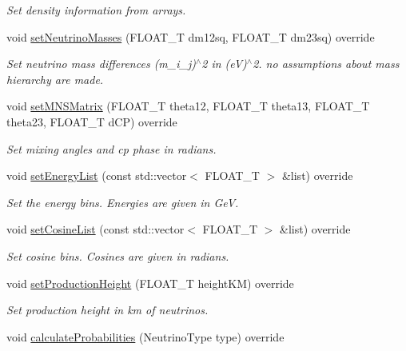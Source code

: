 \begin{DoxyCompactItemize}
\begin{DoxyCompactList}\small\item\em Set density information from arrays. \end{DoxyCompactList}\item 
void \hyperlink{classcudaprob3_1_1CudaPropagator_abb9d8cc79c88f9cf6886cd334ed9e869}{set\+Neutrino\+Masses} (F\+L\+O\+A\+T\+\_\+T dm12sq, F\+L\+O\+A\+T\+\_\+T dm23sq) override
\begin{DoxyCompactList}\small\item\em Set neutrino mass differences (m\+\_\+i\+\_\+j)$^\wedge$2 in (eV)$^\wedge$2. no assumptions about mass hierarchy are made. \end{DoxyCompactList}\item 
void \hyperlink{classcudaprob3_1_1CudaPropagator_ad4fd47cd63e3b45919ae80d876698ac4}{set\+M\+N\+S\+Matrix} (F\+L\+O\+A\+T\+\_\+T theta12, F\+L\+O\+A\+T\+\_\+T theta13, F\+L\+O\+A\+T\+\_\+T theta23, F\+L\+O\+A\+T\+\_\+T d\+CP) override
\begin{DoxyCompactList}\small\item\em Set mixing angles and cp phase in radians. \end{DoxyCompactList}\item 
void \hyperlink{classcudaprob3_1_1CudaPropagator_aa2fd3a1c4c30ea967e5ac14a32ee5b7f}{set\+Energy\+List} (const std\+::vector$<$ F\+L\+O\+A\+T\+\_\+T $>$ \&list) override
\begin{DoxyCompactList}\small\item\em Set the energy bins. Energies are given in GeV. \end{DoxyCompactList}\item 
void \hyperlink{classcudaprob3_1_1CudaPropagator_afb6f73bd2451d64cfcd2b893b9b86413}{set\+Cosine\+List} (const std\+::vector$<$ F\+L\+O\+A\+T\+\_\+T $>$ \&list) override
\begin{DoxyCompactList}\small\item\em Set cosine bins. Cosines are given in radians. \end{DoxyCompactList}\item 
void \hyperlink{classcudaprob3_1_1CudaPropagator_ad639f2aa32a548b74a9a9c82d498b24a}{set\+Production\+Height} (F\+L\+O\+A\+T\+\_\+T height\+KM) override
\begin{DoxyCompactList}\small\item\em Set production height in km of neutrinos. \end{DoxyCompactList}\item 
void \hyperlink{classcudaprob3_1_1CudaPropagator_abafc49cd41569e985bd3bd9e07b31149}{calculate\+Probabilities} (Neutrino\+Type type) override

\end{DoxyCompactItemize}
